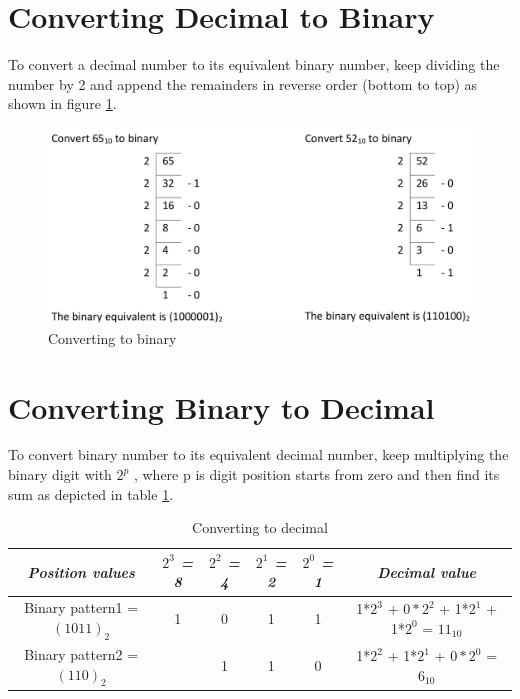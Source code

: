 \section{Converting Decimal to Binary}

To convert a decimal number to its equivalent binary number, keep dividing the number by 2 and append the remainders in reverse order (bottom to top) as shown in figure \ref{fig:dec_to_bin}.



\begin{figure}
    \centering
    \includegraphics{Images/DTMF/decimal_to_binary.png}
    \caption[Decimal to binary]{Converting to binary}
    \label{fig:dec_to_bin}
\end{figure}

\section{Converting Binary to Decimal}

To convert binary number to its equivalent decimal number, keep multiplying the binary digit with $2^p$ , where p is digit position starts from zero and then find its sum as depicted in table \ref{tab:bin_to_dec}.

\begin{table}
    \renewcommand{\arraystretch}{1.5}
    \begin{tabular}{|c|c|c|c|c|c|}
    \hline
        \textbf{\textit{Position values}} & \textbf{\textit{$2^3$ = 8}} & \textbf{\textit{$2^2$ = 4}} & \textbf{\textit{$2^1$ = 2}} & \textbf{\textit{$2^0$ = 1}} & \textbf{\textit{Decimal value}} \\ \hline
        Binary pattern1 = $(1011)_2$ & 1 & 0 & 1 & 1 & 1*$2^3$  + $0*2^2$ + 1*$2^1$ + 1*$2^0$ = $11_{10}$ \\ \hline
        Binary pattern2 = $(110)_2$ &  & 1 & 1 & 0 & 1*$2^2$ + 1*$2^1$ + $0*2^0$ = $6_{10}$ \\ \hline
    \end{tabular}
    \vspace{3mm}
    \caption[Binary to decimal]{Converting to decimal}
    \label{tab:bin_to_dec}
\end{table}


